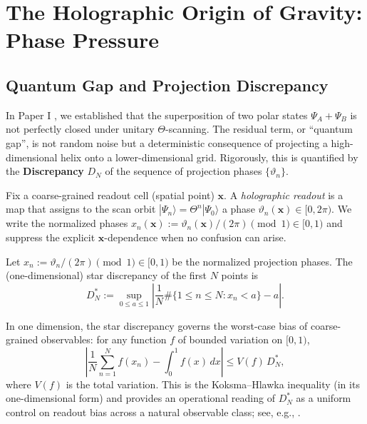 \section{The Holographic Origin of Gravity: Phase Pressure}
\label{sec:phase_pressure}

\subsection{Quantum Gap and Projection Discrepancy}
In Paper I \cite{Ma2025HPA}, we established that the superposition of two polar states $\Psi_A + \Psi_B$ is not perfectly closed under unitary $\Theta$-scanning. The residual term, or ``quantum gap'', is not random noise but a deterministic consequence of projecting a high-dimensional helix onto a lower-dimensional grid. Rigorously, this is quantified by the \textbf{Discrepancy} $D_N$ of the sequence of projection phases $\{\vartheta_n\}$.

\begin{definition}
\label{def:phase_readout}
Fix a coarse-grained readout cell (spatial point) $\mathbf{x}$. A \emph{holographic readout} is a map that assigns to the scan orbit $|\Psi_n\rangle=\Theta^n|\Psi_0\rangle$ a phase $\vartheta_n(\mathbf{x})\in[0,2\pi)$.
We write the normalized phases $x_n(\mathbf{x}) := \vartheta_n(\mathbf{x})/(2\pi)\pmod{1}\in[0,1)$ and suppress the explicit $\mathbf{x}$-dependence when no confusion can arise.
\end{definition}

\begin{definition}
Let $x_n:=\vartheta_n/(2\pi)\pmod{1}\in[0,1)$ be the normalized projection phases. The (one-dimensional) star discrepancy of the first $N$ points is
\begin{equation}
  D_N^* := \sup_{0\le a\le 1}\left|\frac{1}{N}\#\{1\le n\le N: x_n<a\}-a\right|.
\end{equation}
\end{definition}

\begin{remark}
In one dimension, the star discrepancy governs the worst-case bias of coarse-grained observables: for any function $f$ of bounded variation on $[0,1)$,
\begin{equation}
  \left|\frac{1}{N}\sum_{n=1}^N f(x_n)-\int_0^1 f(x)\,dx\right|
  \le V(f)\,D_N^*,
\end{equation}
where $V(f)$ is the total variation. This is the Koksma--Hlawka inequality (in its one-dimensional form) and provides an operational reading of $D_N^*$ as a uniform control on readout bias across a natural observable class; see, e.g., \cite{KuipersNiederreiter1974}.
\end{remark}

